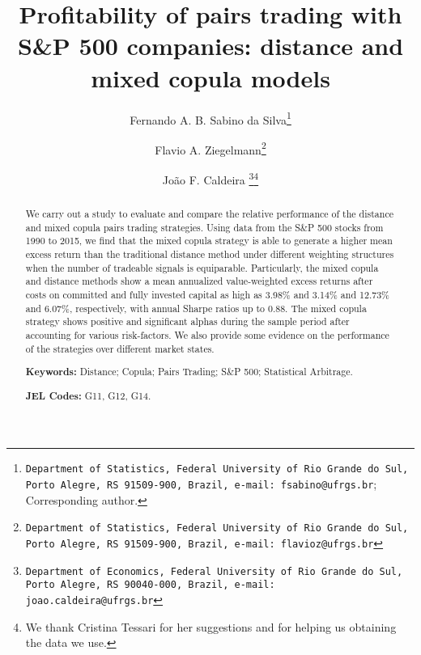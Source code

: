 \documentclass[a4paper]{article}
\begin{document}
	
	
	\makeatletter
	\def\@maketitle{%
		\newpage
		\null
		\vskip 2em%
		\begin{center}%
			\let \footnote \thanks
			{\Large\bfseries \@title \par}%
			\vskip 1.5em%
			{\normalsize
				\lineskip .5em%
				\begin{tabular}[t]{c}%
					\@author
				\end{tabular}\par}%
			\vskip 1em%
			{\normalsize \@date}%
		\end{center}%
		\par
		\vskip 1.5em}
	\makeatother
	
	\title{Profitability of pairs trading with S\&P 500 companies: distance and mixed copula models}
	\author[]{ Fernando A. B. Sabino da Silva\thanks{\texttt{Department of Statistics, Federal University of Rio Grande do Sul, Porto Alegre, RS 91509-900, Brazil, e-mail: fsabino@ufrgs.br}; Corresponding author.}}
	\author[]{Flavio A. Ziegelmann\thanks{\texttt{Department of Statistics, Federal University of Rio Grande do Sul, Porto Alegre, RS 91509-900, Brazil, e-mail: flavioz@ufrgs.br}}}
	\author[]{João F. Caldeira \thanks{\texttt{Department of Economics, Federal University of Rio Grande do Sul, Porto Alegre, RS 90040-000, Brazil, e-mail: joao.caldeira@ufrgs.br}}\thanks{We thank Cristina Tessari for her suggestions and for helping us obtaining the data we use.}}
	\affil[]{}
	\date{}
	\maketitle
	
	
	\begin{abstract}
		We carry out a study to evaluate and compare the relative performance of the distance and mixed copula pairs trading strategies. Using data from the S\&P 500 stocks from 1990 to 2015, we find that the mixed copula strategy is able to generate a higher mean excess return than the traditional distance method under different weighting structures when the number of tradeable signals is equiparable. Particularly, the mixed copula and distance methods show a mean annualized value-weighted excess returns after costs on committed and fully invested capital as high as 3.98\% and 3.14\% and 12.73\% and 6.07\%, respectively, with annual Sharpe ratios up to 0.88. The mixed copula strategy shows positive and significant alphas during the sample period after accounting for various risk-factors. We also provide some evidence on the performance of the strategies over different market states. 
		
		\smallskip
		
		\noindent \textbf{Keywords:} Distance; Copula; Pairs Trading; S\&P 500; Statistical Arbitrage.
		
		\noindent \textbf{JEL Codes:} G11, G12, G14.
	\end{abstract}
	
\end{document}
